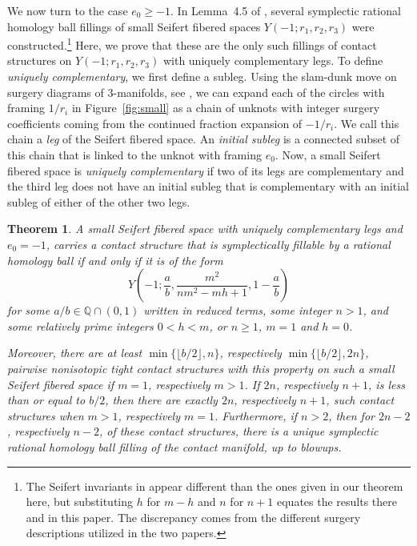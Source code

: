 \documentclass[11pt]{amsart}
\theoremstyle{plain}
\newtheorem{theorem}{Theorem}
\theoremstyle{definition}
\theoremstyle{remark}
\numberwithin{theorem}{section}
\newcommand{\dfn}[1]{{\em #1}}        %
\newcommand{\Q}{\mathbb{Q}}           %
\begin{document}
We now turn to the case $e_0 \geq -1$. In Lemma~4.5 of \cite{EtnyreOzbagciTosun2025}, several symplectic rational homology ball fillings of small Seifert fibered spaces $Y(-1;r_1,r_2,r_3)$ were constructed.\footnote{The Seifert invariants in \cite{EtnyreOzbagciTosun2025} appear different than the ones given in our theorem here, but substituting $h$ for $m-h$ and $n$ for $n+1$ equates the results there and in this paper. The discrepancy comes from the different surgery descriptions utilized in the two papers.} Here, we prove that these are the only such fillings of contact structures on  $Y(-1; r_1, r_2, r_3)$ with uniquely complementary legs. To define \dfn{uniquely complementary}, we first define a subleg. Using the slam-dunk move on surgery diagrams of $3$-manifolds, see \cite{EtnyreOzbagciTosun2025}, we can expand each of the circles with framing $1/r_i$ in Figure~\ref{fig:small} as a chain of unknots with integer surgery coefficients coming from the continued fraction expansion of $-1/r_i$.  We call this chain a \dfn{leg} of the Seifert fibered space. An \dfn{initial subleg} is a connected subset of this chain that is linked to the unknot with framing $e_0$. Now, a small Seifert fibered space is \dfn{uniquely complementary} if two of its legs are complementary and the third leg does not have an initial subleg that is complementary with an initial subleg of either of the other two legs. 

\begin{theorem} \label{thm: minusone} 
A small Seifert fibered space with uniquely complementary legs and $e_0=-1$,  carries a contact structure that is symplectically fillable by a rational homology ball if and only if it is of the form $$Y(-1; \dfrac{a}{b}, \dfrac{m^2}{nm^2-mh+1}, 1-\dfrac{a}{b})$$for some $a/b\in \Q\cap (0,1)$ written in reduced terms, some integer $n > 1$, and some relatively prime integers $0 < h < m$, or $n\geq 1$, $m=1$ and $h=0$.

Moreover, there are at least $\min\{\lfloor b/2\rfloor,n\}$, respectively $\min\{\lfloor b/2\rfloor,2n\}$, pairwise nonisotopic tight contact structures with this property on such a small Seifert fibered space if $m=1$, respectively $m>1$. If $2n$, respectively $n+1$, is less than or equal to $b/2$, then there are exactly $2n$, respectively $n+1$,  such contact structures when $m>1$, respectively $m=1$. Furthermore, if $n>2$, then for $2n-2$, respectively $n-2$, of these contact structures, there is a unique symplectic rational homology ball filling of the contact manifold, up to blowups. 
\end{theorem}
\end{document}
